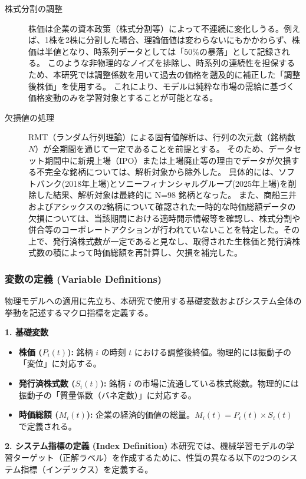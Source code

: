 \documentclass[11pt,a4paper,oneside]{ltjsarticle}
\begin{document}
\begin{description}
\item[株式分割の調整]
株価は企業の資本政策（株式分割等）によって不連続に変化しうる。例えば、1株を2株に分割した場合、理論価値は変わらないにもかかわらず、株価は半値となり、時系列データとしては「50\%の暴落」として記録される。
このような非物理的なノイズを排除し、時系列の連続性を担保するため、本研究では調整係数を用いて過去の価格を遡及的に補正した「調整後株価」を使用する。
これにより、モデルは純粋な市場の需給に基づく価格変動のみを学習対象とすることが可能となる。

\item[欠損値の処理]
RMT（ランダム行列理論）による固有値解析は、行列の次元数（銘柄数 $N$）が全期間を通じて一定であることを前提とする。
そのため、データセット期間中に新規上場（IPO）または上場廃止等の理由でデータが欠損する不完全な銘柄については、解析対象から除外した。 
具体的には、ソフトバンク(2018年上場)とソニーフィナンシャルグループ(2025年上場)を削除した結果、解析対象は最終的に N=98 銘柄となった。
また、商船三井およびアシックスの2銘柄について確認された一時的な時価総額データの欠損については、当該期間における適時開示情報等を確認し、株式分割や併合等のコーポレートアクションが行われていないことを特定した。その上で、発行済株式数が一定であると見なし、取得された生株価と発行済株式数の積によって時価総額を再計算し、欠損を補完した。
\end{description}

\subsubsection{変数の定義 (Variable Definitions)}
物理モデルへの適用に先立ち、本研究で使用する基礎変数およびシステム全体の挙動を記述するマクロ指標を定義する。

\textbf{1. 基礎変数}
\begin{itemize}
    \item \textbf{株価 ($P_i(t)$):} 銘柄 $i$ の時刻 $t$ における調整後終値。物理的には振動子の「変位」に対応する。
    \item \textbf{発行済株式数 ($S_i(t)$):} 銘柄 $i$ の市場に流通している株式総数。物理的には振動子の「質量係数（バネ定数）」に対応する。
    \item \textbf{時価総額 ($M_i(t)$):} 企業の経済的価値の総量。$M_i(t) = P_i(t) \times S_i(t)$ で定義される。
\end{itemize}

\textbf{2. システム指標の定義 (Index Definition)}
本研究では、機械学習モデルの学習ターゲット（正解ラベル）を作成するために、性質の異なる以下の2つのシステム指標（インデックス）を定義する。
\end{document}
